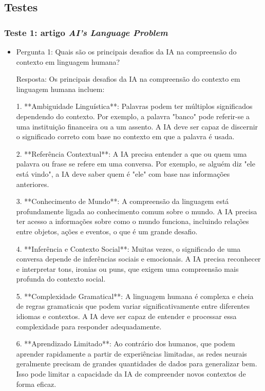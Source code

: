 \documentclass[12 pt]{article}
\begin{document}
\subsection*{Testes}
\subsubsection*{Teste 1: artigo \textit{AI’s Language Problem}}
\begin{itemize}
    \item Pergunta 1: Quais são os principais desafios da IA na compreensão do contexto em linguagem humana?

    Resposta: Os principais desafios da IA na compreensão do contexto em linguagem humana incluem:
    
    1. **Ambiguidade Linguística**: Palavras podem ter múltiplos significados dependendo do contexto. Por exemplo, a palavra "banco" pode referir-se a uma instituição financeira ou a um assento. A IA deve ser capaz de discernir o significado correto com base no contexto em que a 
    palavra é usada.
    
    2. **Referência Contextual**: A IA precisa entender a que ou quem uma palavra ou frase se refere em uma conversa. Por exemplo, se alguém diz "ele está vindo", a IA deve saber quem é "ele" com base nas informações anteriores.
    
    3. **Conhecimento de Mundo**: A compreensão da linguagem está profundamente ligada ao conhecimento comum sobre o mundo. A IA precisa ter acesso a informações sobre como o mundo funciona, incluindo relações entre objetos, ações e eventos, o que é um grande desafio.
    
    4. **Inferência e Contexto Social**: Muitas vezes, o significado de uma conversa depende de 
    inferências sociais e emocionais. A IA precisa reconhecer e interpretar tons, ironias ou puns, que exigem uma compreensão mais profunda do contexto social.
    
    5. **Complexidade Gramatical**: A linguagem humana é complexa e cheia de regras gramaticais 
    que podem variar significativamente entre diferentes idiomas e contextos. A IA deve ser capaz de entender e processar essa complexidade para responder adequadamente.
    
    6. **Aprendizado Limitado**: Ao contrário dos humanos, que podem aprender rapidamente a partir de experiências limitadas, as redes neurais geralmente precisam de grandes quantidades de dados para generalizar bem. Isso pode limitar a capacidade da IA de compreender novos contextos de forma eficaz.
    

\end{itemize}
\end{document}
